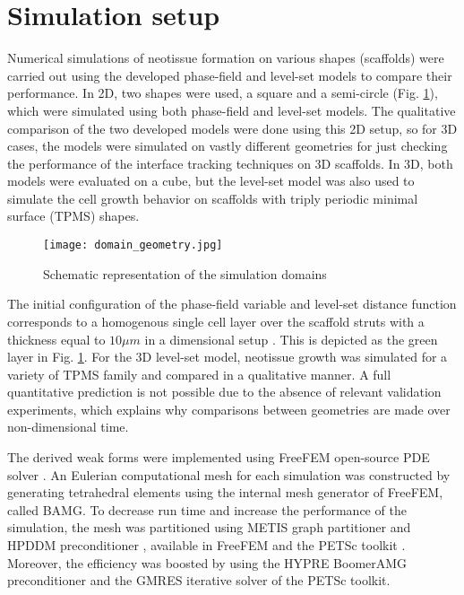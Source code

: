 \section{Simulation setup}


Numerical simulations of neotissue formation on various shapes (scaffolds) were carried out using the developed phase-field and level-set models to compare their performance. In 2D, two shapes were used, a square and a semi-circle (Fig. \ref{fig:tissue_domain_geometry}), which were simulated using both phase-field and level-set models. The qualitative comparison of the two developed models were done using this 2D setup, so for 3D cases, the models were simulated on vastly different geometries for just checking the performance of the interface tracking techniques on 3D scaffolds. In 3D, both models were evaluated on a cube, but the level-set model was also used to simulate the cell growth behavior on scaffolds with triply periodic minimal surface (\gls{TPMS}) shapes.

\begin{figure}
\centering
\medskip
\texttt{[image: domain\_geometry.jpg]}
\caption[Schematic representation of the simulation domains]{Schematic representation of the simulation domains}
\label{fig:tissue_domain_geometry}
\end{figure}

The initial configuration of the phase-field variable and level-set distance function corresponds to a homogenous single cell layer over the scaffold struts with a thickness equal to $10 \mu m$ in a dimensional setup \cite{Darling2008}. This is depicted as the green layer in Fig. \ref{fig:tissue_domain_geometry}. For the 3D level-set model, neotissue growth was simulated for a variety of \gls{TPMS} family and compared in a qualitative manner. A full quantitative prediction is not possible due to the absence of relevant validation experiments, which explains why comparisons between geometries are made over non-dimensional time.

The derived weak forms were implemented using FreeFEM open-source \gls{PDE} solver \cite{Hecht2012}. An Eulerian computational mesh for each simulation was constructed by generating tetrahedral elements using the internal mesh generator of FreeFEM, called BAMG. To decrease run time and increase the performance of the simulation, the mesh was partitioned using  METIS graph partitioner \cite{METIS1998} and \gls{HPDDM} preconditioner \cite{Jolivet2013}, available in FreeFEM and the \gls{PETSc} toolkit \cite{petsc}. Moreover, the efficiency was boosted by using the HYPRE BoomerAMG preconditioner \cite{Falgout2002} and the \gls{GMRES} iterative solver \cite{Saad1986} of the \gls{PETSc} toolkit.


